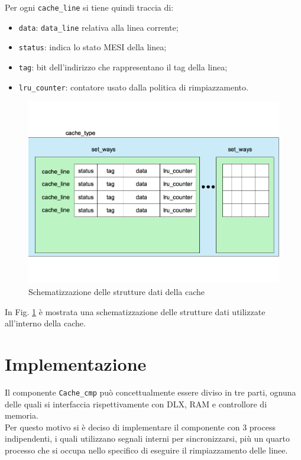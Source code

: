 Per ogni \texttt{cache\_line} si tiene quindi traccia di:
\begin{itemize}
  \item \texttt{data}: \texttt{data\_line} relativa alla linea corrente;
  \item \texttt{status}: indica lo stato MESI della linea;
  \item \texttt{tag}: bit dell'indirizzo che rappresentano il tag della linea;
  \item \texttt{lru\_counter}: contatore usato dalla politica di rimpiazzamento.
\end{itemize}


\begin{figure}[h!]
\centering
\includegraphics[width=\textwidth]{img/cacheType.png}
\caption{Schematizzazione delle strutture dati della cache}
\label{fig:c_type}
\end{figure}

In Fig. \ref{fig:c_type} \`e mostrata una schematizzazione delle strutture dati utilizzate all'interno della cache.

\section{Implementazione}

Il componente \texttt{Cache\_cmp} pu\`o concettualmente essere diviso in tre parti, ognuna delle quali si interfaccia rispettivamente con DLX, RAM e controllore di memoria.\\
Per questo motivo si \`e deciso di implementare il componente con 3 process indipendenti, i quali utilizzano segnali interni per sincronizzarsi, pi\`u un quarto processo che si occupa nello specifico di eseguire il rimpiazzamento delle linee.\\

